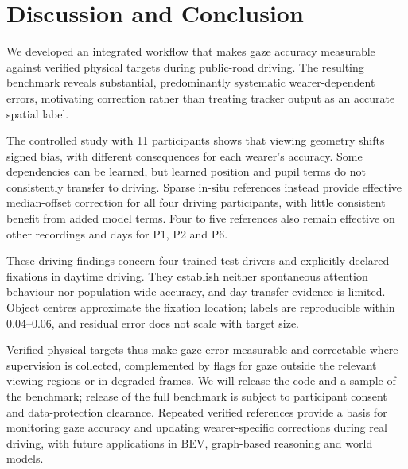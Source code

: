 \section{Discussion and Conclusion}
\label{sec:conclusion}

We developed an integrated workflow that makes gaze accuracy
measurable against verified physical targets during public-road
driving. The resulting benchmark reveals substantial,
predominantly systematic wearer-dependent errors, motivating
correction rather than treating tracker output as an accurate
spatial label.

The controlled study with 11 participants shows that viewing
geometry shifts signed bias, with different consequences for
each wearer's accuracy. Some dependencies can be learned, but
learned position and pupil terms do not consistently transfer to driving.
Sparse in-situ references instead provide effective median-offset
correction for all four driving participants, with little
consistent benefit from added model terms. Four to five references also remain effective on
other recordings and days for P1, P2 and P6.


These driving findings concern four trained test drivers and
explicitly declared fixations in daytime driving. They establish
neither spontaneous attention behaviour nor population-wide
accuracy, and day-transfer evidence is limited. Object centres
approximate the fixation location; labels are reproducible
within 0.04--0.06\dg{}, and residual error does not scale with
target size.

Verified physical targets thus make gaze error measurable and
correctable where supervision is collected, complemented by
flags for gaze outside the relevant viewing regions or in
degraded frames. We will release the code and a sample of
the benchmark; release of the full benchmark is subject to
participant consent and data-protection clearance. Repeated verified references provide a basis for
monitoring gaze accuracy and updating wearer-specific corrections
during real driving, with future
applications in BEV, graph-based reasoning and world models.

